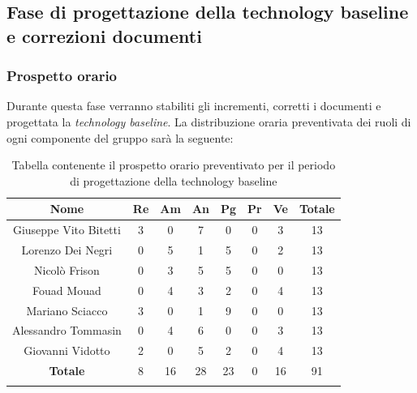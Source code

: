 	
	
	\subsection{Fase di progettazione della technology baseline e correzioni documenti}
		\subsubsection{Prospetto orario}
		Durante questa fase verranno stabiliti gli incrementi, corretti i documenti e progettata la \textit{technology baseline}. La distribuzione oraria preventivata dei ruoli di ogni componente del gruppo sarà la seguente:
		
		\begin{longtable}{|c|c|c|c|c|c|c|c|}
			\hline
			\rowcolor{lighter-grayer}
			\textbf{Nome} & \textbf{Re} & \textbf{Am} & \textbf{An} & \textbf{Pg}  & \textbf{Pr}   & \textbf{Ve} & \textbf{Totale} \\
			\hline
			\endfirsthead
			
			\hline
			Giuseppe Vito Bitetti 		& 3 & 0 & 7 & 0 & 0 & 3 & 13\\
			\hline
			\hline
			Lorenzo Dei Negri			& 0 & 5 & 1 & 5 & 0 & 2 & 13\\
			\hline
			\hline
			Nicolò Frison				   & 0 & 3 & 5 & 5 & 0 & 0 & 13\\
			\hline
			\hline
			Fouad Mouad 				& 0 & 4 & 3 & 2 & 0 & 4 & 13\\
			\hline
			\hline
			Mariano Sciacco 			& 3& 0 & 1 & 9 & 0 & 0 & 13\\
			\hline
			\hline
			Alessandro Tommasin    & 0 & 4 & 6 & 0 & 0 & 3 & 13\\
			\hline
			\hline
			Giovanni Vidotto 			& 2 & 0 & 5 & 2 & 0 & 4 & 13\\
			\hline 
			\textbf{Totale}			 & 8 &  16 & 28 & 23 & 0 & 16 & 91\\
			\hline
			\caption{Tabella contenente il prospetto orario preventivato per il periodo di progettazione della technology baseline}
		\end{longtable}
		\pagebreak
		
